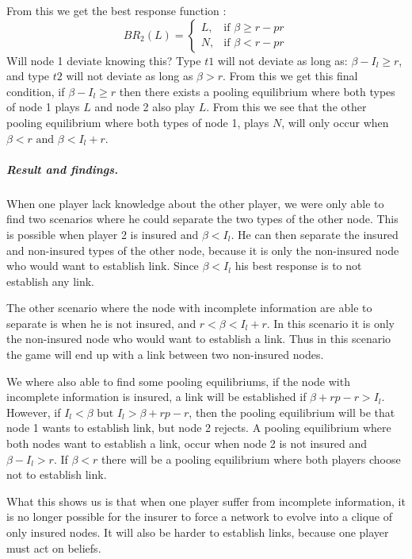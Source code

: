 From this we get the best response function :
\begin{equation}
BR_{2}(L)=
\begin{cases}
	L,& \text{if } \beta\geq r-pr\\
   N,& \text{if } \beta<r-pr  
\end{cases}
\end{equation}
Will node 1 deviate knowing this?
Type $t1$ will not deviate as long as: $\beta - I_{l} \geq r$, and type $t2$ will not deviate as long as $\beta >r$.
From this we get this final condition, if $\beta-I_{l}\geq r$ then there exists a pooling equilibrium where both types of node 1 plays $L$ and node 2 also play $L$.
From this we see that the other pooling equilibrium where both types of node 1, plays $N$, will only occur when $\beta<r \text{ and } \beta<I_l+r$.

\subparagraph{Result and findings.}
When one player lack knowledge about the other player, we were only able to find two scenarios where he could separate the two types of the other node. This is possible when player 2 is insured and $\beta<I_{l}$. He can then separate the insured and non-insured types of the other node, because it is only the non-insured node who would want to establish link. Since $\beta<I_{l}$ his best response is to not establish any link.

The other scenario where the node with incomplete information are able to separate is when he is not insured, and $r<\beta<I_{l}+r$. In this scenario it is only the non-insured node who would want to establish a link. Thus in this scenario the game will end up with a link between two non-insured nodes.

We where also able to find some pooling equilibriums, if the node with incomplete information is insured, a link will be established if $\beta+rp-r>I_{l}$. However, if $I_{l}<\beta \text{ but } I_{l}>\beta+rp-r$, then the pooling equilibrium will be that node 1 wants to establish link, but node 2 rejects.
A pooling equilibrium where both nodes want to establish a link, occur when node 2 is not insured and $\beta-I_{l}>r$. If $\beta<r$ there will be a pooling equilibrium where both players choose not to establish link. 

What this shows us is that when one player suffer from incomplete information, it is no longer possible for the insurer to force a network to evolve into a clique of only insured nodes. It will also be harder to establish links, because one player must act on beliefs.  
